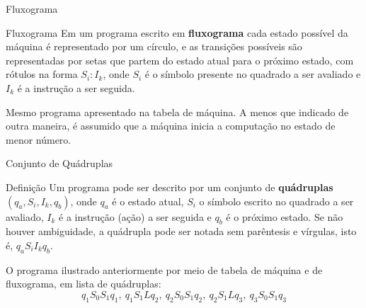 \begin{frame}[fragile]{Fluxograma}

    \begin{block}{Fluxograma}
        Em um programa escrito em \textbf{fluxograma} cada estado possível da máquina é 
        representado por um círculo, e as transições possíveis são representadas por setas
        que partem do estado atual para o próximo estado, 
        com rótulos na forma $S_i:I_k$, onde $S_i$ é o símbolo presente no quadrado a ser
        avaliado e $I_k$ é a instrução a ser seguida.
    \end{block}

    \vspace{0.1in}

    Mesmo programa apresentado na tabela de máquina. A menos que indicado de outra maneira, é 
    assumido que a máquina inicia a computação no estado de menor número.

    \vspace{0.1in}

    \begin{figure}[h]
        \centering
    \end{figure}

\end{frame}

\begin{frame}[fragile]{Conjunto de Quádruplas}

    \begin{block}{Definição}
        Um programa pode ser descrito por um conjunto de \textbf{quádruplas} 
        $(q_a, S_i, I_k, q_b)$, onde $q_a$ é o estado atual, $S_i$ o símbolo escrito no quadrado
        a ser avaliado, $I_k$ é a instrução (ação) a ser seguida e $q_b$ é o próximo estado.
        Se não houver ambiguidade, a quádrupla pode ser notada sem parêntesis e vírgulas, isto é,
        $q_aS_iI_kq_b$.
    \end{block}

    \vspace{0.1in}

    O programa ilustrado anteriormente por meio de tabela de máquina e de fluxograma, em lista 
    de quádruplas:
    \[
        q_1S_0S_1q_1,\ q_1S_1Lq_2,\
        q_2S_0S_1q_2,\ q_2S_1Lq_3,\
        q_3S_0S_1q_3
    \]
\end{frame}

